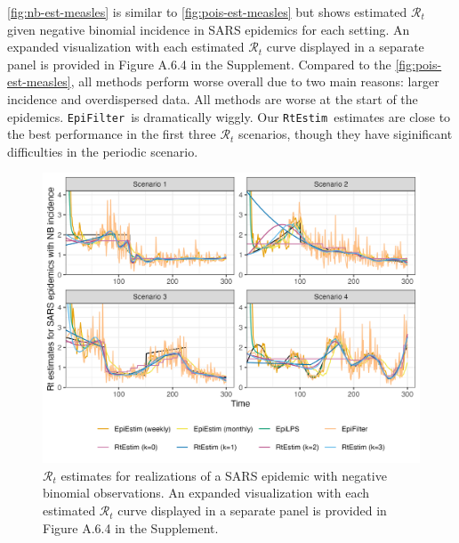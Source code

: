 \documentclass[10pt,letterpaper]{article}
\def\RtEstim{\texttt{RtEstim}}
\def\EpiEstim{\texttt{EpiEstim}}
\def\EpiFilter{\texttt{EpiFilter}}
\def\calR{\mathcal{R}}
\begin{document}
\autoref{fig:nb-est-measles} is similar to \autoref{fig:pois-est-measles} but
shows estimated $\calR_t$ given negative binomial incidence in SARS epidemics
for each setting. An expanded visualization with each estimated $\calR_t$ curve
displayed in a separate panel is provided in Figure A.6.4 in the Supplement.
Compared to the \autoref{fig:pois-est-measles}, all methods perform worse
overall due to two main reasons: larger incidence and overdispersed data. All
methods are worse at the start of the epidemics. \EpiFilter\ is dramatically
wiggly. Our \RtEstim\ estimates are close to the best
performance in the first three $\calR_t$ scenarios, though they have
siginificant difficulties in the periodic scenario. 


\begin{figure}[!t]
  \centering
  \includegraphics*[width=.9\linewidth]{fig/fig_res_NB_sars.png}
  \caption{
    $\calR_t$ estimates for realizations of a SARS epidemic with
    negative binomial observations. An expanded visualization with each estimated
    $\calR_t$ curve displayed in a separate panel is provided in Figure A.6.4 in
    the Supplement.}
  \label{fig:nb-est-measles}
\end{figure}
\end{document}

